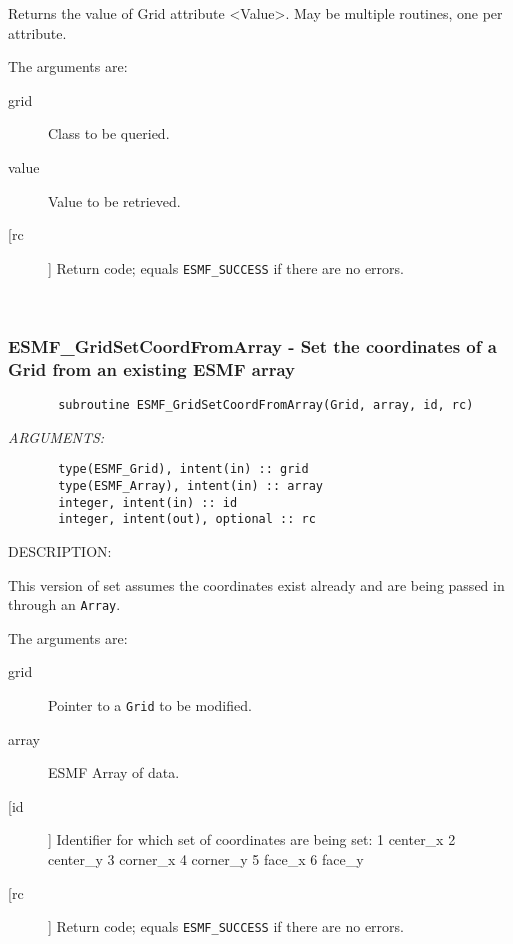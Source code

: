        Returns the value of Grid attribute <Value>.
       May be multiple routines, one per attribute.
  
       The arguments are:
       \begin{description}
       \item[grid]
            Class to be queried.
       \item[value]
            Value to be retrieved.
       \item[[rc]]
            Return code; equals {\tt ESMF\_SUCCESS} if there are no errors.
       \end{description}
   
 
\mbox{}\hrulefill\ 
 
\subsubsection{ESMF\_GridSetCoordFromArray - Set the coordinates of a Grid from an existing ESMF array}


 
\begin{verbatim}       subroutine ESMF_GridSetCoordFromArray(Grid, array, id, rc)\end{verbatim}{\em ARGUMENTS:}
\begin{verbatim}       type(ESMF_Grid), intent(in) :: grid
       type(ESMF_Array), intent(in) :: array
       integer, intent(in) :: id
       integer, intent(out), optional :: rc\end{verbatim}
{\sf DESCRIPTION:\\ }


       This version of set assumes the coordinates exist already and are being
       passed in through an {\tt Array}.
  
       The arguments are:
       \begin{description}
       \item[grid]
            Pointer to a {\tt Grid} to be modified.
       \item[array]
            ESMF Array of data.
       \item[[id]]
            Identifier for which set of coordinates are being set:
               1  center\_x
               2  center\_y
               3  corner\_x
               4  corner\_y
               5  face\_x
               6  face\_y 
       \item[[rc]]
            Return code; equals {\tt ESMF\_SUCCESS} if there are no errors.
       \end{description}
   
